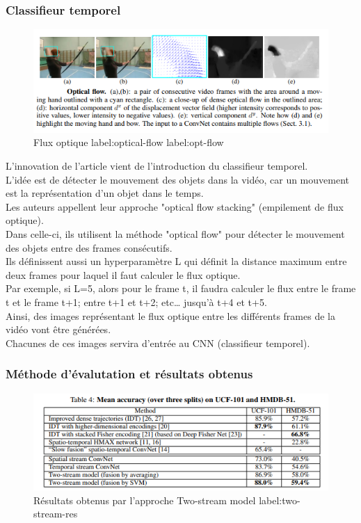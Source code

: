 \documentclass[11pt]{article}
\begin{document}
\subsubsection{Classifieur temporel}
\label{sec:orgdb13ee5}
\begin{figure}[htbp]
\centering
\includegraphics[width=12cm]{optical_flow.png}
\caption{Flux optique label:optical-flow label:opt-flow}
\end{figure}
L'innovation de l'article vient de l'introduction du classifieur temporel.\\

L'idée est de détecter le mouvement des objets dans la vidéo, car un mouvement est la représentation d'un objet dans le temps.\\
Les auteurs appellent leur approche "optical flow stacking" (empilement de flux optique).\\

Dans celle-ci, ils utilisent la méthode "optical flow" pour détecter le mouvement des objets entre des frames consécutifs.\\

Ils définissent aussi un hyperparamètre L qui définit la distance maximum entre deux frames pour laquel il faut calculer le flux optique.\\
Par exemple, si L=5, alors pour le frame t, il faudra calculer le flux entre le frame t et le frame t+1; entre t+1 et t+2; etc\ldots{} jusqu'à t+4 et t+5.\\
Ainsi, des images représentant le flux optique entre les différents frames de la vidéo vont être générées.\\

Chacunes de ces images servira d'entrée au CNN (classifieur temporel).\\
\subsubsection{Méthode d'évalutation et résultats obtenus}
\label{sec:orga203de6}
\begin{figure}[htbp]
\centering
\includegraphics[width=13cm]{two_stream_res.png}
\caption{Résultats obtenus par l'approche Two-stream model label:two-stream-res}
\end{figure}
\end{document}
